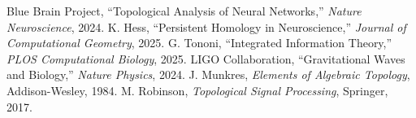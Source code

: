 \documentclass[11pt]{article}
\begin{document}
\begin{thebibliography}{4}
 Blue Brain Project, ``Topological Analysis of Neural Networks,'' \emph{Nature Neuroscience}, 2024.
 K. Hess, ``Persistent Homology in Neuroscience,'' \emph{Journal of Computational Geometry}, 2025.
 G. Tononi, ``Integrated Information Theory,'' \emph{PLOS Computational Biology}, 2025.
 LIGO Collaboration, ``Gravitational Waves and Biology,'' \emph{Nature Physics}, 2024.
 J. Munkres, \emph{Elements of Algebraic Topology}, Addison-Wesley, 1984.
 M. Robinson, \emph{Topological Signal Processing}, Springer, 2017.
\end{thebibliography}
\end{document}
